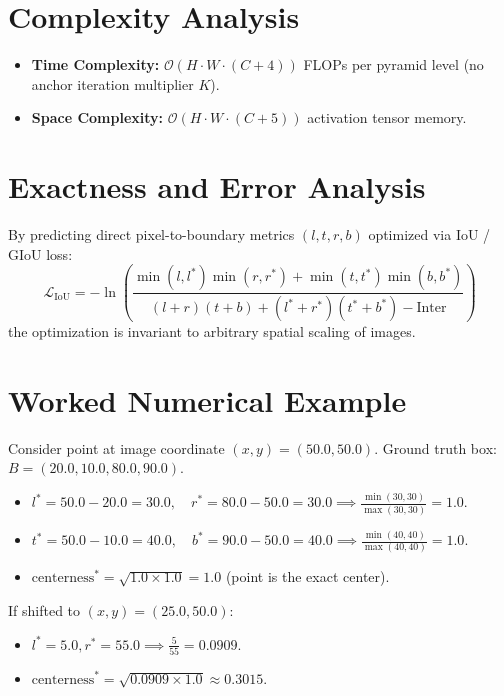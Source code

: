 \documentclass[11pt,a4paper]{article}
\theoremstyle{definition}
\begin{document}
\section{Complexity Analysis}

\begin{itemize}
    \item \textbf{Time Complexity:} $\mathcal{O}(H \cdot W \cdot (C + 4))$ FLOPs per pyramid level (no anchor iteration multiplier $K$).
    \item \textbf{Space Complexity:} $\mathcal{O}(H \cdot W \cdot (C + 5))$ activation tensor memory.
\end{itemize}

\section{Exactness and Error Analysis}

By predicting direct pixel-to-boundary metrics $(l, t, r, b)$ optimized via IoU / GIoU loss:
\begin{equation}
\mathcal{L}_{\text{IoU}} = -\ln \left( \frac{\min(l, l^*)\min(r, r^*) + \min(t, t^*)\min(b, b^*)}{(l+r)(t+b) + (l^*+r^*)(t^*+b^*) - \text{Inter}} \right)
\end{equation}
the optimization is invariant to arbitrary spatial scaling of images.

\section{Worked Numerical Example}

Consider point at image coordinate $(x, y) = (50.0, 50.0)$.
Ground truth box: $B = (20.0, 10.0, 80.0, 90.0)$.
\begin{itemize}
    \item $l^* = 50.0 - 20.0 = 30.0, \quad r^* = 80.0 - 50.0 = 30.0 \implies \frac{\min(30,30)}{\max(30,30)} = 1.0$.
    \item $t^* = 50.0 - 10.0 = 40.0, \quad b^* = 90.0 - 50.0 = 40.0 \implies \frac{\min(40,40)}{\max(40,40)} = 1.0$.
    \item $\text{centerness}^* = \sqrt{1.0 \times 1.0} = 1.0$ (point is the exact center).
\end{itemize}
If shifted to $(x, y) = (25.0, 50.0)$:
\begin{itemize}
    \item $l^* = 5.0, r^* = 55.0 \implies \frac{5}{55} = 0.0909$.
    \item $\text{centerness}^* = \sqrt{0.0909 \times 1.0} \approx 0.3015$.
\end{itemize}
\end{document}
